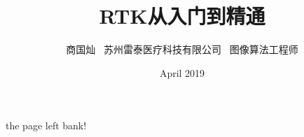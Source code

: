 \documentclass[a4paper,11pt,twoside, openany]{ctexbook}
\title{RTK从入门到精通}
\author{商国灿 \ 苏州雷泰医疗科技有限公司 \ 图像算法工程师}
\date{April 2019}
\begin{document}
\maketitle

\newpage

the page left bank!






















\end{document}
